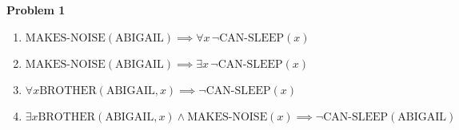 {\bf Problem 1}

\begin{enumerate}[label={\arabic*.}]
    \item $\textrm{MAKES-NOISE}(\textrm{ABIGAIL}) \implies \forall x \, \neg \textrm{CAN-SLEEP}(x)$
    \item $\textrm{MAKES-NOISE}(\textrm{ABIGAIL}) \implies \exists x \, \neg \textrm{CAN-SLEEP}(x)$
    \item $\forall x \textrm{BROTHER} ( \textrm{ABIGAIL}, x ) \implies \neg \textrm{CAN-SLEEP}(x)$
    \item $\exists x \textrm{BROTHER} ( \textrm{ABIGAIL}, x ) \land \textrm{MAKES-NOISE} ( x ) \implies \neg \textrm{CAN-SLEEP} ( \textrm{ABIGAIL} )$
\end{enumerate}
